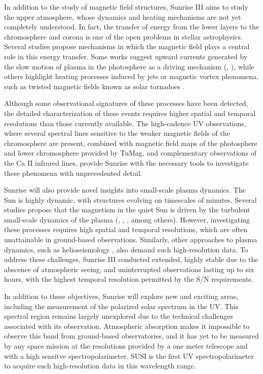 In addition to the study of magnetic field structures, Sunrise III aims to study the upper atmosphere, whose dynamics and heating mechanisms are not yet completely understood. In fact, the transfer of energy from the lower layers to the chromosphere and corona is one of the open problems in stellar astrophysics. Several studies propose mechanisms in which the magnetic field plays a central role in this energy transfer. Some works suggest upward currents generated by the slow motion of plasma in the photosphere as a driving mechanism (\citealt{upwards1}, \citealt{upwards2}), while others highlight heating processes induced by jets \citep{jetscorona} or magnetic vortex phenomena, such as twisted magnetic fields known as solar tornadoes \citep{solar_tornadoes}.

Although some observational signatures of these processes have been detected, the detailed characterization of these events requires higher spatial and temporal resolutions than those currently available. The high-cadence UV observations, where several spectral lines sensitive to the weaker magnetic fields of the chromosphere are present, combined with magnetic field maps of the photosphere and lower chromosphere provided by TuMag, and complementary observations of the Ca II infrared lines, provide Sunrise with the necessary tools to investigate these phenomena with unprecedented detail.

Sunrise will also provide novel insights into small-scale plasma dynamics. The Sun is highly dynamic, with structures evolving on timescales of minutes. Several studies propose that the magnetism in the quiet Sun is driven by the turbulent small-scale dynamics of the plasma (\cite{small_scale_dynamo}, \cite{small_scale_dynamo_2}, \cite{small_scale_dynamo_3}, among others). However, investigating these processes requires high spatial and temporal resolutions, which are often unattainable in ground-based observations. Similarly, other approaches to plasma dynamics, such as helioseismology \citep{helioseismology}, also demand such high-resolution data. To address these challenges, Sunrise III conducted extended, highly stable due to the abscence of atmospheric seeing, and uninterrupted observations lasting up to six hours, with the highest temporal resolution permitted by the S/N requirements.

In addition to these objectives, Sunrise will explore new and exciting areas, including the measurement of the polarized solar spectrum in the UV. This spectral region remains largely unexplored due to the technical challenges associated with its observation. Atmospheric absorption makes it impossible to observe this band from ground-based observatories, and it has yet to be measured by any space mission at the resolutions provided by a one meter telescope and with a high sensitve spectropolarimeter. SUSI is the first UV spectropolarimeter to acquire such high-resolution data in this wavelength range.


